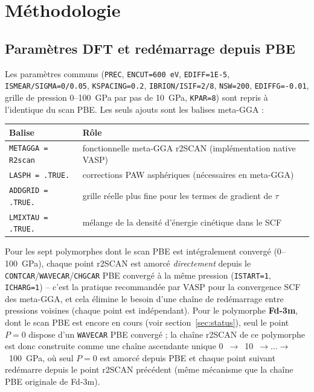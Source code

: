 \documentclass[11pt,a4paper]{article}
\begin{document}
\section{Méthodologie}

\subsection{Paramètres DFT et redémarrage depuis PBE}

Les paramètres communs (\texttt{PREC}, \texttt{ENCUT=600~eV}, \texttt{EDIFF=1E-5},
\texttt{ISMEAR/SIGMA=0/0.05}, \texttt{KSPACING=0.2}, \texttt{IBRION/ISIF=2/8},
\texttt{NSW=200}, \texttt{EDIFFG=-0.01}, grille de pression 0--100~GPa par pas de 10~GPa,
\texttt{KPAR=8}) sont repris à l'identique du scan PBE. Les seuls ajouts sont les balises
meta-GGA :

\begin{center}
\begin{tabular}{ll}
\toprule
Balise & Rôle \\
\midrule
\texttt{METAGGA = R2scan} & fonctionnelle meta-GGA r2SCAN (implémentation native VASP) \\
\texttt{LASPH = .TRUE.} & corrections PAW asphériques (nécessaires en meta-GGA) \\
\texttt{ADDGRID = .TRUE.} & grille réelle plus fine pour les termes de gradient de $\tau$ \\
\texttt{LMIXTAU = .TRUE.} & mélange de la densité d'énergie cinétique dans le SCF \\
\bottomrule
\end{tabular}
\end{center}

Pour les sept polymorphes dont le scan PBE est intégralement convergé (0--100~GPa), chaque point
r2SCAN est amorcé \emph{directement} depuis le \texttt{CONTCAR}/\texttt{WAVECAR}/\texttt{CHGCAR}
PBE convergé à la même pression (\texttt{ISTART=1}, \texttt{ICHARG=1}) -- c'est la pratique
recommandée par VASP pour la convergence SCF des meta-GGA, et cela élimine le besoin d'une
chaîne de redémarrage entre pressions voisines (chaque point est indépendant). Pour le
polymorphe \textbf{Fd-3m}, dont le scan PBE est encore en cours (voir
section~\ref{sec:status}), seul le point $P=0$ dispose d'un \texttt{WAVECAR} PBE convergé ; la
chaîne r2SCAN de ce polymorphe est donc construite comme une chaîne ascendante unique
0~$\to$~10~$\to \dots \to$~100~GPa, où seul $P=0$ est amorcé depuis PBE et chaque point suivant
redémarre depuis le point r2SCAN précédent (même mécanisme que la chaîne PBE originale de
Fd-3m).
\end{document}
